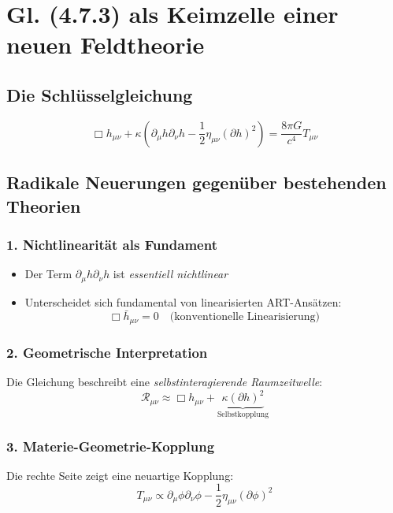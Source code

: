 \section{Gl. (4.7.3) als Keimzelle einer neuen Feldtheorie}
\label{sec:neue_feldtheorie}

\subsection{Die Schlüsselgleichung}
\begin{equation}
\Box h_{\mu\nu} + \kappa\left(\partial_\mu h \partial_\nu h - \frac{1}{2}\eta_{\mu\nu}(\partial h)^2\right) = \frac{8\pi G}{c^4}T_{\mu\nu}
\tag{4.7.3}
\end{equation}

\subsection{Radikale Neuerungen gegenüber bestehenden Theorien}

\subsubsection{1. Nichtlinearität als Fundament}
\begin{itemize}
\item Der Term $\partial_\mu h \partial_\nu h$ ist \textit{essentiell nichtlinear}
\item Unterscheidet sich fundamental von linearisierten ART-Ansätzen:
\begin{equation}
\Box \bar{h}_{\mu\nu} = 0 \quad \text{(konventionelle Linearisierung)}
\end{equation}
\end{itemize}

\subsubsection{2. Geometrische Interpretation}
Die Gleichung beschreibt eine \textit{selbstinteragierende Raumzeitwelle}:
\begin{equation}
\mathcal{R}_{\mu\nu} \approx \Box h_{\mu\nu} + \underbrace{\kappa(\partial h)^2}_{\text{Selbstkopplung}}
\end{equation}

\subsubsection{3. Materie-Geometrie-Kopplung}
Die rechte Seite zeigt eine neuartige Kopplung:
\begin{equation}
T_{\mu\nu} \propto \partial_\mu\phi\partial_\nu\phi - \frac{1}{2}\eta_{\mu\nu}(\partial\phi)^2
\end{equation}

